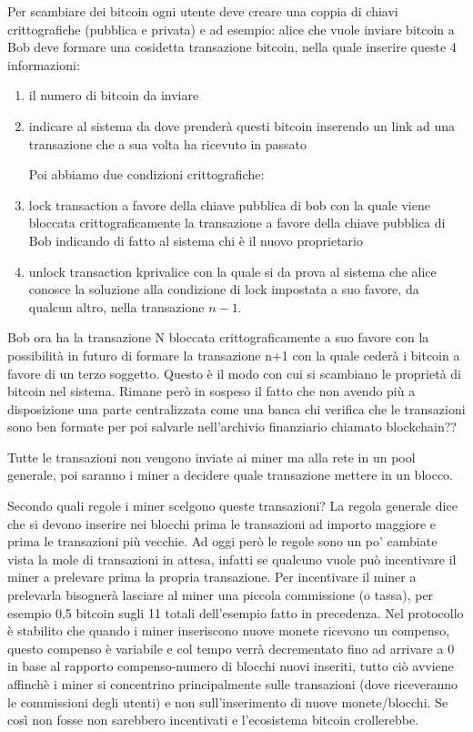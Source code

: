 Per scambiare dei bitcoin ogni utente deve creare una coppia di chiavi crittografiche (pubblica e privata) e ad esempio: alice che vuole inviare bitcoin a Bob deve formare una cosidetta transazione bitcoin, nella quale inserire
queste 4 informazioni:

\begin{enumerate}
    \item il numero di bitcoin da inviare
    
    \item indicare al sistema da dove prenderà questi bitcoin inserendo un link ad una transazione che a sua volta ha ricevuto in passato
    
    Poi abbiamo due condizioni crittografiche:
    
    \item lock transaction a favore della chiave pubblica di bob con la quale viene bloccata crittograficamente la transazione a favore della chiave pubblica di Bob indicando di fatto al sistema chi è il nuovo proprietario
    
    \item unlock transaction kprivalice con la quale si da prova al sistema che alice conosce la soluzione alla condizione di lock impostata a suo favore, da qualcun altro, nella transazione $n-1$.
\end{enumerate}
Bob ora ha la transazione N bloccata crittograficamente a suo favore con la possibilità in futuro di formare la
transazione n+1 con la quale cederà i bitcoin a favore di un terzo soggetto. Questo è il modo con cui si scambiano
le proprietà di bitcoin nel sistema. Rimane però in sospeso il fatto che non avendo più a disposizione una parte
centralizzata come una banca chi verifica che le transazioni sono ben formate per poi salvarle nell’archivio
finanziario chiamato blockchain??

\singlespacing

Tutte le transazioni non vengono inviate ai miner ma alla rete in un pool generale, poi saranno i miner a
decidere quale transazione mettere in un blocco.

\singlespacing

Secondo quali regole i miner scelgono queste transazioni?
La regola generale dice che si devono inserire nei blocchi prima le transazioni ad importo maggiore e prima le
transazioni più vecchie. Ad oggi però le regole sono un po' cambiate vista la mole di transazioni in attesa, infatti
se qualcuno vuole può incentivare il miner a prelevare prima la propria transazione. Per incentivare il miner a
prelevarla bisognerà lasciare al miner una piccola commissione (o tassa), per esempio 0,5 bitcoin sugli 11 totali
dell’esempio fatto in precedenza. Nel protocollo è stabilito che quando i miner inseriscono nuove monete ricevono
un compenso, questo compenso è variabile e col tempo verrà decrementato fino ad arrivare a 0 in base al rapporto
compenso-numero di blocchi nuovi inseriti, tutto ciò avviene affinchè i miner si concentrino principalmente
sulle transazioni (dove riceveranno le commissioni degli utenti) e non sull’inserimento di nuove
monete/blocchi. Se così non fosse non sarebbero incentivati e l’ecosistema bitcoin crollerebbe.

